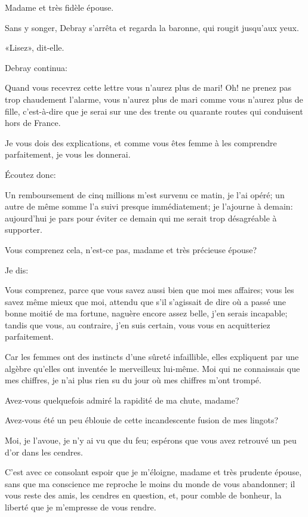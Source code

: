 \begin{mail}{}{Madame et très fidèle épouse.}
	\pausemail
	
Sans y songer, Debray s'arrêta et regarda la baronne, qui rougit jusqu'aux yeux. 

«Lisez», dit-elle. 

Debray continua: 

\resumemail

Quand vous recevrez cette lettre vous n'aurez plus de mari! Oh! ne prenez pas trop chaudement l'alarme, vous n'aurez plus de mari comme vous n'aurez plus de fille, c'est-à-dire que je serai sur une des trente ou quarante routes qui conduisent hors de France. 

Je vous dois des explications, et comme vous êtes femme à les comprendre parfaitement, je vous les donnerai. 

Écoutez donc: 

Un remboursement de cinq millions m'est survenu ce matin, je l'ai opéré; un autre de même somme l'a suivi presque immédiatement; je l'ajourne à demain: aujourd'hui je pars pour éviter ce demain qui me serait trop désagréable à supporter. 

Vous comprenez cela, n'est-ce pas, madame et très précieuse épouse? 

Je dis: 

Vous comprenez, parce que vous savez aussi bien que moi mes affaires; vous les savez même mieux que moi, attendu que s'il s'agissait de dire où a passé une bonne moitié de ma fortune, naguère encore assez belle, j'en serais incapable; tandis que vous, au contraire, j'en suis certain, vous vous en acquitteriez parfaitement. 

Car les femmes ont des instincts d'une sûreté infaillible, elles expliquent par une algèbre qu'elles ont inventée le merveilleux lui-même. Moi qui ne connaissais que mes chiffres, je n'ai plus rien su du jour où mes chiffres m'ont trompé. 

Avez-vous quelquefois admiré la rapidité de ma chute, madame? 

Avez-vous été un peu éblouie de cette incandescente fusion de mes lingots? 

Moi, je l'avoue, je n'y ai vu que du feu; espérons que vous avez retrouvé un peu d'or dans les cendres. 

C'est avec ce consolant espoir que je m'éloigne, madame et très prudente épouse, sans que ma conscience me reproche le moins du monde de vous abandonner; il vous reste des amis, les cendres en question, et, pour comble de bonheur, la liberté que je m'empresse de vous rendre. 


\end{mail}
